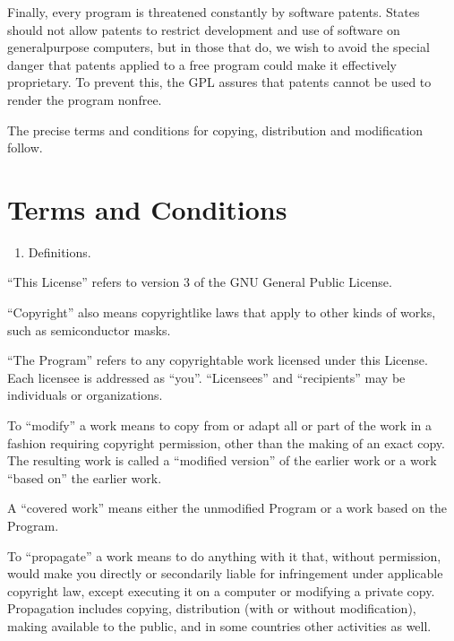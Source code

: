 \documentclass[letterpaper,10pt,english]{sphinxmanual}
\begin{document}
\sphinxAtStartPar
Finally, every program is threatened constantly by software patents. States should not allow patents to restrict development and use of software on general\sphinxhyphen{}purpose computers, but in those that do, we wish to avoid the special danger that patents applied to a free program could make it effectively proprietary. To prevent this, the GPL assures that patents cannot be used to render the program non\sphinxhyphen{}free.

\sphinxAtStartPar
The precise terms and conditions for copying, distribution and modification follow.


\section{Terms and Conditions}
\label{\detokenize{license:terms-and-conditions}}\begin{enumerate}
%
\setcounter{enumi}{-1}
\item {} 
\sphinxAtStartPar
Definitions.

\end{enumerate}

\sphinxAtStartPar
“This License” refers to version 3 of the GNU General Public License.

\sphinxAtStartPar
“Copyright” also means copyright\sphinxhyphen{}like laws that apply to other kinds of works, such as semiconductor masks.

\sphinxAtStartPar
“The Program” refers to any copyrightable work licensed under this License. Each licensee is addressed as “you”. “Licensees” and “recipients” may be individuals or organizations.

\sphinxAtStartPar
To “modify” a work means to copy from or adapt all or part of the work in a fashion requiring copyright permission, other than the making of an exact copy. The resulting work is called a “modified version” of the earlier work or a work “based on” the earlier work.

\sphinxAtStartPar
A “covered work” means either the unmodified Program or a work based on the Program.

\sphinxAtStartPar
To “propagate” a work means to do anything with it that, without permission, would make you directly or secondarily liable for infringement under applicable copyright law, except executing it on a computer or modifying a private copy. Propagation includes copying, distribution (with or without modification), making available to the public, and in some countries other activities as well.
\end{document}

